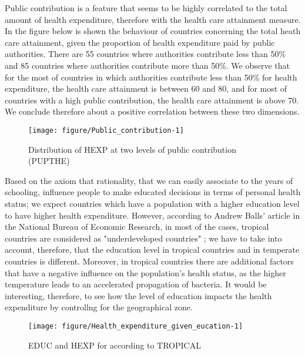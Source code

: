 \documentclass[12pt,a4paper]{article}\usepackage[]{graphicx}\usepackage[]{color}
\begin{document}
Public contribution is a feature that seems to be highly correlated to the total amount of health expenditure, therefore with the health care attainment measure. In the figure below is shown the behaviour of countries concerning the total heath care attainment, given the proportion of health expenditure paid by public authorities.  There are 55 countries where authorities contribute less than 50\% and 85 countries where authorities contribute more than 50\%. We observe that for the most of countries in which authorities contribute less than 50\% for health expenditure, the health care attainment is between 60 and 80, and for most of countries with a high public contribution, the health care attainment is above 70. We conclude therefore about a positive correlation between these two dimensions.
\begin{figure}[!htbp]

{\centering \texttt{[image: figure/Public\_contribution-1]} 

}

\caption[Distribution of HEXP at two levels of public contribution (PUPTHE)]{Distribution of HEXP at two levels of public contribution (PUPTHE)}\label{fig:Public contribution}
\end{figure}




Based on the axiom that  rationality, that we can easily associate to the years of schooling, influence people to make educated decisions in terms of personal health status; we expect countries which have a population with a higher education level to have higher health expenditure. However, according to Andrew Balls' article in the National Bureau of Economic Research, in most of the cases, tropical countries are considered as "underdeveloped countries" ; we have to take into account, therefore,  that the education level in tropical countries and in temperate  countries is different. Moreover, in tropical countries there are additional factors that have a negative influence on the population's health status, as the higher temperature leads to an accelerated propagation of bacteria.  It would be interesting, therefore, to see how the level of education impacts the health expenditure by controllng for the geographical zone.

\begin{figure}[!htbp]

{\centering \texttt{[image: figure/Health\_expenditure\_given\_eucation-1]} 

}

\caption[EDUC and HEXP for according to TROPICAL]{EDUC and HEXP for according to TROPICAL}\label{fig:Health expenditure given eucation}
\end{figure}
\end{document}
